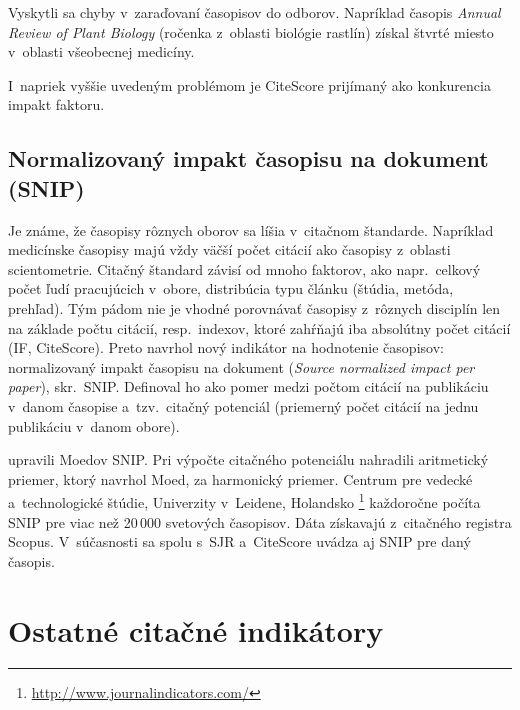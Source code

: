 Vyskytli sa chyby v~zaraďovaní časopisov do odborov.  Napríklad časopis
\emph{Annual Review of Plant Biology} (ročenka z~oblasti biológie rastlín)
získal štvrté miesto v~oblasti všeobecnej medicíny.

I~napriek vyššie uvedeným problémom je CiteScore prijímaný ako konkurencia
impakt faktoru.

\subsection{Normalizovaný impakt časopisu na dokument (SNIP)}
\label{sec:snip}

Je známe, že časopisy rôznych oborov sa líšia v~citačnom štandarde.  Napríklad
medicínske časopisy majú vždy väčší počet citácií ako časopisy z~oblasti
scientometrie.  Citačný štandard závisí od mnoho faktorov, ako napr.~celkový
počet ľudí pracujúcich v~obore, distribúcia typu článku (štúdia, metóda,
prehľad).  Tým pádom nie je vhodné porovnávať časopisy z~rôznych disciplín len
na základe počtu citácií, resp.~indexov, ktoré zahŕňajú iba absolútny počet
citácií (IF, CiteScore).  Preto \citet{Moed2010} navrhol nový indikátor na
hodnotenie časopisov: normalizovaný impakt časopisu na dokument (\emph{Source
  normalized impact per paper}), skr.~SNIP.  Definoval ho ako pomer medzi
počtom citácií na publikáciu v~danom časopise a~tzv.~citačný potenciál
(priemerný počet citácií na jednu publikáciu v~danom obore).

\citet{Waltman2013} upravili Moedov SNIP.  Pri výpočte citačného potenciálu
nahradili aritmetický priemer, ktorý navrhol Moed, za harmonický priemer.
Centrum pre vedecké a~technologické štúdie, Univerzity v~Leidene, Holandsko%
\footnote{\url{http://www.journalindicators.com/}} každoročne počíta
SNIP pre viac než 20\,000 svetových časopisov.  Dáta získavajú z~citačného
registra Scopus.  V~súčasnosti sa spolu s~SJR a~CiteScore uvádza aj SNIP
pre daný časopis.

\section{Ostatné citačné indikátory}

